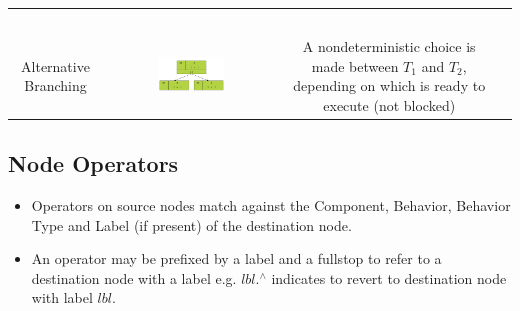 \documentclass[]{article}
\begin{document}
\begin{landscape}
\begin{center}
\begin{longtable}[c]{|c|c|c|p{}|}
&&\\*
&&\\*
&&\\*
&&\\*
&&\\
\hline
\multirow{7}{*}{Alternative Branching}&\multirow{7}{*}{\includegraphics[width=0.4\textwidth]{figs/AppendixB/Composition/Alternative.pdf}}&  \multirow{7}{0.65\textwidth}{A nondeterministic choice is made between $T_1$ and $T_2$, depending on which is ready to execute (not blocked)} \\*
&&\\*
&&\\*
&&\\*
&&\\*
&&\\*
&&\\*
\hline
\end{longtable}
\end{center}

\subsection{Node Operators}

\begin{small}
\singlespacing
\begin{itemize}
\item Operators on source nodes match against the Component, Behavior, Behavior Type and Label (if present) of the destination node.
\item An operator may be prefixed by a label and a fullstop to refer to a destination node with a label e.g. $lbl.^{\wedge}$ indicates to revert to destination node with label $lbl$.
\end{itemize}
\end{small}


\end{landscape}
\end{document}
